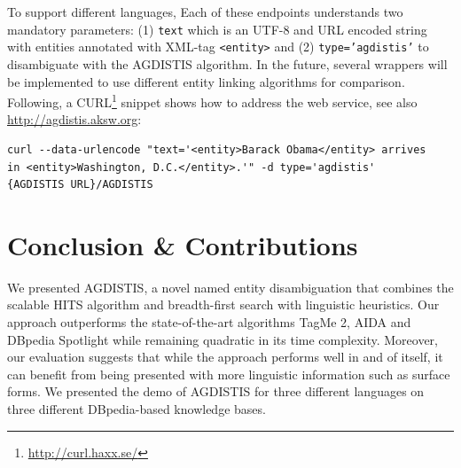 To support different languages,%
Each of these endpoints understands two mandatory parameters: (1) \texttt{text} which is an UTF-8 and URL encoded string with entities annotated with XML-tag \texttt{<entity>} and (2) \texttt{type='agdistis'} to disambiguate with the AGDISTIS algorithm.
In the future, several wrappers will be implemented to use different entity linking algorithms for comparison.
Following, a CURL\footnote{\url{http://curl.haxx.se/}} snippet shows how to address the web service, see also \url{http://agdistis.aksw.org}:
\begin{verbatim}
curl --data-urlencode "text='<entity>Barack Obama</entity> arrives 
in <entity>Washington, D.C.</entity>.'" -d type='agdistis' 
{AGDISTIS URL}/AGDISTIS
\end{verbatim}




\section{Conclusion \& Contributions}
\label{sec:conclusion}
We presented AGDISTIS, a novel named entity disambiguation that combines the scalable \ac{HITS} algorithm and breadth-first search with linguistic heuristics.
Our approach outperforms the state-of-the-art algorithms TagMe 2, AIDA and DBpedia Spotlight while remaining quadratic in its time complexity. 
Moreover, our evaluation suggests that while the approach performs well in and of itself, it can benefit from being presented with more linguistic information such as surface forms. 
We presented the demo of AGDISTIS for three different languages on three different DBpedia-based knowledge bases.

